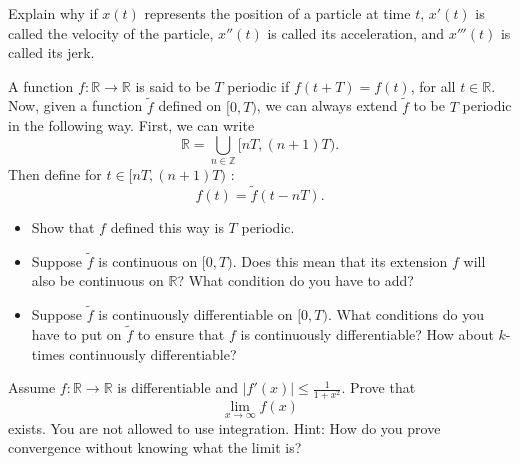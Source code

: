   \begin{exercise}
    Explain why if $x(t)$ represents the position of a particle at time $t$, $x'(t)$ is called the velocity of the particle, $x''(t)$ is called its acceleration, and $x'''(t)$ is called its jerk.
  \end{exercise}
  \begin{solution}

  \end{solution}

  \begin{exercise}
    A function $f : \mathbb{R} \to \mathbb{R}$ is said to be $T$ periodic if $f(t + T) = f(t)$, for all $t \in \mathbb{R}$. Now, given a function $\tilde{f}$ defined on $[0, T)$, we can always extend $\tilde{f}$ to be $T$ periodic in the following way. First, we can write
    \begin{equation}
      \mathbb{R} = \bigcup_{n\in\mathbb{Z}} [nT,(n + 1)T).
    \end{equation}
    Then define for $t \in [nT,(n + 1)T)$ :
    \begin{equation}
      f(t) = \tilde{f}(t - nT).
    \end{equation}
    
    \begin{itemize}
      \item Show that $f$ defined this way is $T$ periodic.
      \item Suppose $\tilde{f}$ is continuous on $[0, T)$. Does this mean that its extension $f$ will also be continuous on $\mathbb{R}$? What condition do you have to add?
      \item Suppose $\tilde{f}$ is continuously differentiable on $[0, T)$. What conditions do you have to put on $\tilde{f}$ to ensure that $f$ is continuously differentiable? How about $k$-times continuously differentiable?
    \end{itemize}
  \end{exercise}
  \begin{solution}

  \end{solution}

  \begin{exercise}
    Assume $f : \mathbb{R} \to \mathbb{R}$ is differentiable and $|f'(x)| \leq \frac{1}{1+x^2}$. Prove that
    \begin{equation}
      \lim_{x\to\infty}f(x)
    \end{equation}
    exists. You are not allowed to use integration. Hint: How do you prove convergence without knowing what the limit is?
  \end{exercise}
  \begin{solution}

  \end{solution}

